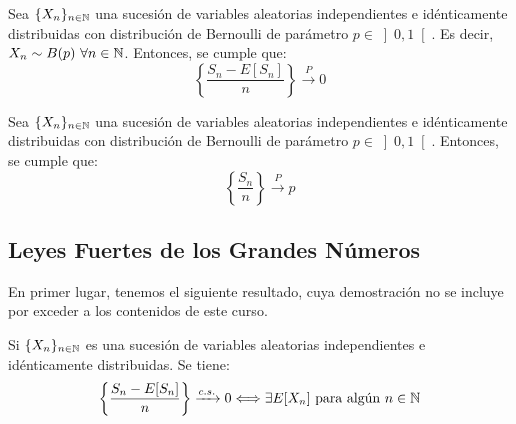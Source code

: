\begin{coro}
    Sea $\{X_n\}_{n\in \mathbb{N}}$ una sucesión de variables aleatorias independientes e idénticamente distribuidas con distribución de Bernoulli de parámetro $p\in \left]0,1\right[$. Es decir, $X_n\sim B(p)~\forall n\in \mathbb{N}$. Entonces, se cumple que:
    \begin{equation*}
        \left\{\frac{S_n-E[S_n]}{n}\right\} \xrightarrow{P} 0
    \end{equation*}
\end{coro}
\begin{coro}
    Sea $\{X_n\}_{n\in \mathbb{N}}$ una sucesión de variables aleatorias independientes e idénticamente distribuidas con distribución de Bernoulli de parámetro $p\in \left]0,1\right[$. Entonces, se cumple que:
    \begin{equation*}
        \left\{\frac{S_n}{n}\right\} \xrightarrow{P} p
    \end{equation*}
\end{coro}


\subsection{Leyes Fuertes de los Grandes Números}

En primer lugar, tenemos el siguiente resultado, cuya demostración no se incluye por exceder a los contenidos de este curso.
\begin{prop}
    Si $\{X_n\}_{n\in \mathbb{N}}$ es una sucesión de variables aleatorias independientes e idénticamente distribuidas. Se tiene:
    \begin{equation*}
        \left\{\frac{S_n-E[S_n]}{n}\right\} \xrightarrow{c.s.} 0
        \Longleftrightarrow \exists E[X_n] \text{ para algún } n\in \mathbb{N}
    \end{equation*}
\end{prop}

